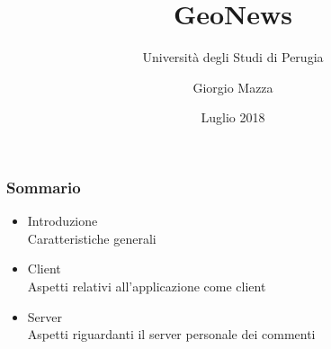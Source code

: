 \documentclass{beamer}
\title{GeoNews}
\subtitle{Università degli Studi di Perugia}
\author{Giorgio Mazza}
\institute{UniPG}
\date{Luglio 2018}
\begin{document}
	\setcounter{showProgressBar}{0}
	\setcounter{showSlideNumbers}{0}

	\frame{\titlepage}
	\begin{frame}
		\frametitle{Sommario}
		\begin{itemize}
			\item Introduzione \\ {\footnotesize\hspace{1em} Caratteristiche generali}
			\item Client \\ {\footnotesize\hspace{1em} Aspetti relativi all'applicazione come client}
			\item Server \\ {\footnotesize\hspace{1em} Aspetti riguardanti il server personale dei commenti}
		\end{itemize}
	\end{frame}

	\setcounter{framenumber}{0}
	\setcounter{showProgressBar}{1}
	\setcounter{showSlideNumbers}{1}
\end{document}
